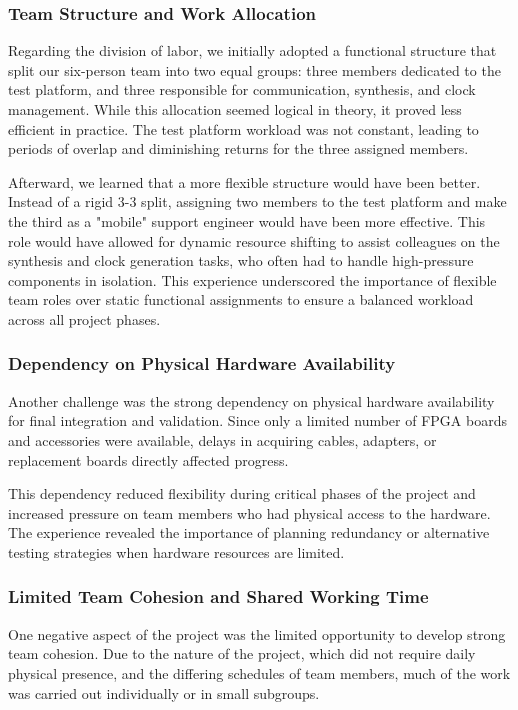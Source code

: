 \documentclass[10pt]{article}
\begin{document}
\subsubsection{Team Structure and Work Allocation}
Regarding the division of labor, we initially adopted a functional structure that split our six-person team into two equal groups: three members dedicated to the test platform, and three responsible for communication, synthesis, and clock management. While this allocation seemed logical in theory, it proved less efficient in practice. The test platform workload was not constant, leading to periods of overlap and diminishing returns for the three assigned members.

Afterward, we learned that a more flexible structure would have been better. Instead of a rigid 3-3 split, assigning two members to the test platform and make the third as a "mobile" support engineer would have been more effective. This role would have allowed for dynamic resource shifting to assist colleagues on the synthesis and clock generation tasks, who often had to handle high-pressure components in isolation. This experience underscored the importance of flexible team roles over static functional assignments to ensure a balanced workload across all project phases.

\subsubsection{Dependency on Physical Hardware Availability}
Another challenge was the strong dependency on physical hardware availability for final integration and validation. Since only a limited number of FPGA boards and accessories were available, delays in acquiring cables, adapters, or replacement boards directly affected progress.

This dependency reduced flexibility during critical phases of the project and increased pressure on team members who had physical access to the hardware. The experience revealed the importance of planning redundancy or alternative testing strategies when hardware resources are limited.

\subsubsection{Limited Team Cohesion and Shared Working Time}
One negative aspect of the project was the limited opportunity to develop strong team cohesion. Due to the nature of the project, which did not require daily physical presence, and the differing schedules of team members, much of the work was carried out individually or in small subgroups.
\end{document}
